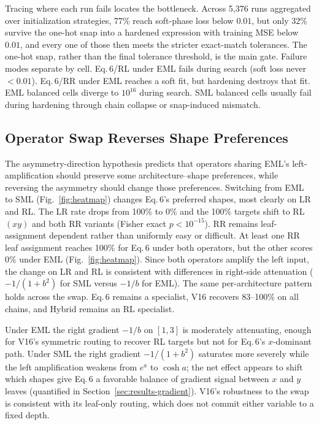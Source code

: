 Tracing where each run fails locates the bottleneck.  Across
5{,}376 runs aggregated over initialization strategies, 77\%
reach soft-phase loss below $0.01$, but only 32\% survive the
one-hot snap into a hardened expression with training MSE below
$0.01$, and every one of those then meets the stricter exact-match
tolerances.  The one-hot snap, rather than the final tolerance
threshold, is the main gate.  Failure modes separate by cell.  Eq.\,6/RL under EML
fails during search (soft loss never $<0.01$).  Eq.\,6/RR under
EML reaches a soft fit, but hardening destroys that fit.  EML balanced
cells diverge to $10^{16}$ during search.  SML balanced cells
usually fail during hardening through chain collapse or
snap-induced mismatch.

\subsection{Operator Swap Reverses Shape Preferences}
\label{sec:results-operators}

The asymmetry-direction hypothesis predicts that operators
sharing EML's left-amplification should preserve some
architecture--shape preferences, while reversing the asymmetry
should change those preferences.  Switching from EML to SML
(Fig.~\ref{fig:heatmap}) changes Eq.\,6's preferred shapes,
most clearly on LR and RL.  The LR rate drops from 100\% to 0\%
and the 100\% targets shift to RL$(xy)$ and both RR variants
(Fisher exact $p < 10^{-15}$).  RR remains leaf-assignment
dependent rather than uniformly easy or difficult.  At least one
RR leaf assignment reaches 100\% for Eq.\,6 under both
operators, but the other scores 0\% under EML
(Fig.~\ref{fig:heatmap}).  Since both operators amplify the
left input, the change on LR and RL is consistent with
differences in right-side attenuation ($-1/(1+b^2)$ for SML
versus $-1/b$ for EML).  The
same per-architecture pattern holds across the swap.  Eq.\,6
remains a specialist, V16 recovers 83--100\% on all chains, and
Hybrid remains an RL specialist.

Under EML the right gradient $-1/b$ on $[1,3]$ is moderately
attenuating, enough for V16's symmetric routing to recover RL
targets but not for Eq.\,6's $x$-dominant path.  Under SML the right
gradient $-1/(1+b^2)$ saturates more severely while the left
amplification weakens from $e^a$ to $\cosh a$; the net effect
appears to shift which shapes give Eq.\,6 a favorable balance of gradient
signal between $x$ and $y$ leaves (quantified in
Section~\ref{sec:results-gradient}).  V16's robustness to the
swap is consistent with its leaf-only routing, which does not
commit either variable to a fixed depth.

